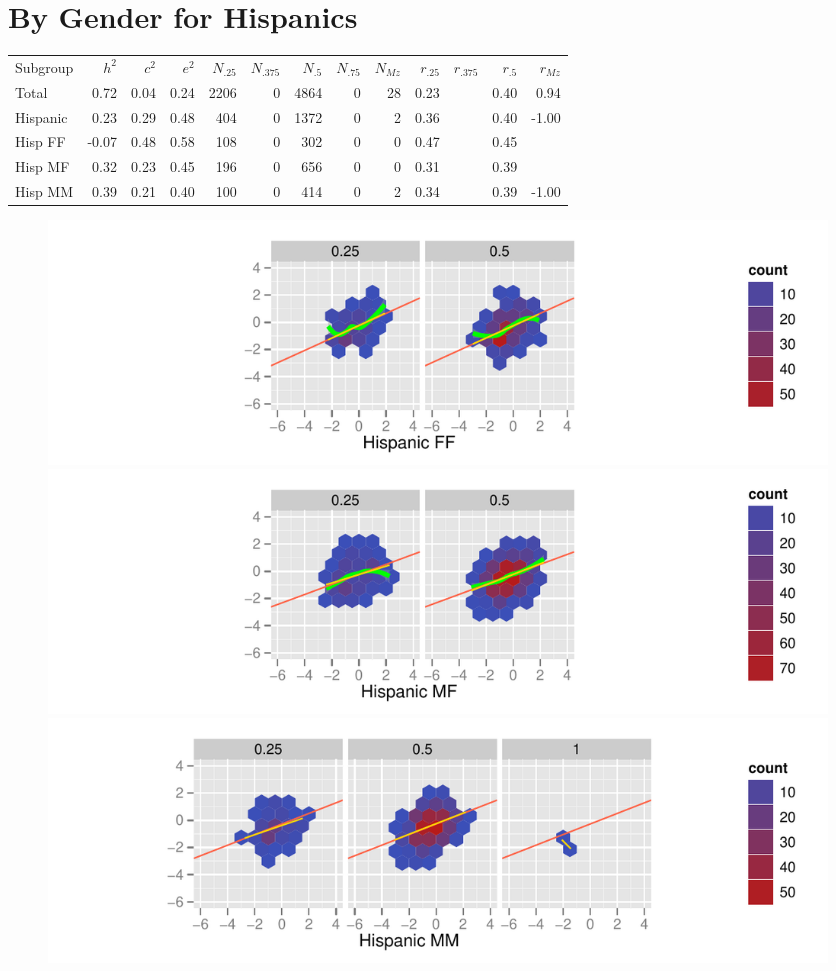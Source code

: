 \documentclass[a4paper]{article}
\begin{document}
\newpage
\section{By Gender for Hispanics}
\begin{table}[ht]
\begin{center}
\begin{tabular}{l|rrr|rrrrr|rrrr}
 Subgroup & $h^2$ & $c^2$ & $e^2$ & $N_{.25}$ & $N_{.375}$ & $N_{.5}$ & $N_{.75}$ & $N_{Mz}$ & $r_{.25}$ & $r_{.375}$ & $r_{.5}$ & $r_{Mz}$ \\ 
 Total & 0.72 & 0.04 & 0.24 & 2206 &   0 & 4864 &   0 &  28 & 0.23 &  & 0.40 & 0.94 \\ 
   \hline
Hispanic & 0.23 & 0.29 & 0.48 & 404 &   0 & 1372 &   0 &   2 & 0.36 &  & 0.40 & -1.00 \\ 
  Hisp FF & -0.07 & 0.48 & 0.58 & 108 &   0 & 302 &   0 &   0 & 0.47 &  & 0.45 &  \\ 
  Hisp MF & 0.32 & 0.23 & 0.45 & 196 &   0 & 656 &   0 &   0 & 0.31 &  & 0.39 &  \\ 
  Hisp MM & 0.39 & 0.21 & 0.40 & 100 &   0 & 414 &   0 &   2 & 0.34 &  & 0.39 & -1.00 \\ 
  \end{tabular}
\end{center}
\end{table}\begin{figure}[htbp]
\includegraphics{Height-014}
\includegraphics{Height-015}
\includegraphics{Height-016}
\end{figure}
\end{document}
